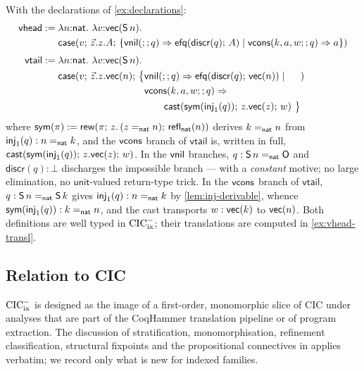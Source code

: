 \begin{example}
\label{ex:vhead-vtail}
With the declarations of \cref{ex:declarations}:
\begin{align*}
  \mathsf{vhead} \mathrel{:=}{} & \lambda n{:}\mathsf{nat}.\ \lambda
    v{:}\mathsf{vec}(\mathsf{S}\,n).\\
  &\mathsf{case}(v;\,\vec{z}.z.A;\,\{
      \mathsf{vnil}(;;q) \Rightarrow \mathsf{efq}(\mathsf{discr}(q);\,A) \mid
      \mathsf{vcons}(k, a, w;; q) \Rightarrow a\})\\[0.7ex]
  \mathsf{vtail} \mathrel{:=}{} & \lambda n{:}\mathsf{nat}.\ \lambda
    v{:}\mathsf{vec}(\mathsf{S}\,n).\\
  &\mathsf{case}(v;\,\vec{z}.z.\mathsf{vec}(n);\,\bigl\{
    \begin{aligned}[t]
      &\mathsf{vnil}(;;q) \Rightarrow \mathsf{efq}(\mathsf{discr}(q);\,\mathsf{vec}(n))
        \mid\\
      &\mathsf{vcons}(k, a, w;; q) \Rightarrow{}\\
      &\qquad
        \mathsf{cast}(\mathsf{sym}(\mathsf{inj}_1(q));\,z.\mathsf{vec}(z);\,w)\
        \bigr\}
    \end{aligned})
\end{align*}
where $\mathsf{sym}(\pi) \mathrel{:=} \mathsf{rew}(\pi;\, z.\,(z =_{\mathsf{nat}} n);\,
\mathsf{refl}_{\mathsf{nat}}(n))$ derives $k =_{\mathsf{nat}} n$ from $\mathsf{inj}_1(q) : n
=_{\mathsf{nat}} k$, and the $\mathsf{vcons}$ branch of $\mathsf{vtail}$ is, written in
full, $\mathsf{cast}(\mathsf{sym}(\mathsf{inj}_1(q));\,z.\mathsf{vec}(z);\,w)$.  In the
$\mathsf{vnil}$ branches, $q : \mathsf{S}\,n =_{\mathsf{nat}} \mathsf{O}$ and $\mathsf{discr}(q) :
\bot$ discharges the impossible branch --- with a \emph{constant}
motive; no large elimination, no $\mathsf{unit}$-valued return-type
trick.  In the $\mathsf{vcons}$ branch of $\mathsf{vtail}$, $q : \mathsf{S}\,n
=_{\mathsf{nat}} \mathsf{S}\,k$ gives $\mathsf{inj}_1(q) : n =_{\mathsf{nat}} k$ by
\cref{lem:inj-derivable}, whence $\mathsf{sym}(\mathsf{inj}_1(q)) : k
=_{\mathsf{nat}} n$, and the cast transports $w : \mathsf{vec}(k)$ to $\mathsf{vec}(n)$.  Both
definitions are well typed in $\mathrm{CIC}^{-}_{\mathrm{ix}}$; their translations are computed
in \cref{ex:vhead-transl}.
\end{example}

\subsection{Relation to CIC}
\label{sec:calculus-cic}

$\mathrm{CIC}^{-}_{\mathrm{ix}}$ is designed as the image of a first-order, monomorphic slice of
CIC under analyses that are part of the CoqHammer translation pipeline
or of program extraction.  The discussion of stratification,
monomorphisation, refinement classification, structural fixpoints and
the propositional connectives in \cite[\S 2.6]{Extraction2026} applies
verbatim; we record only what is new for indexed families.

